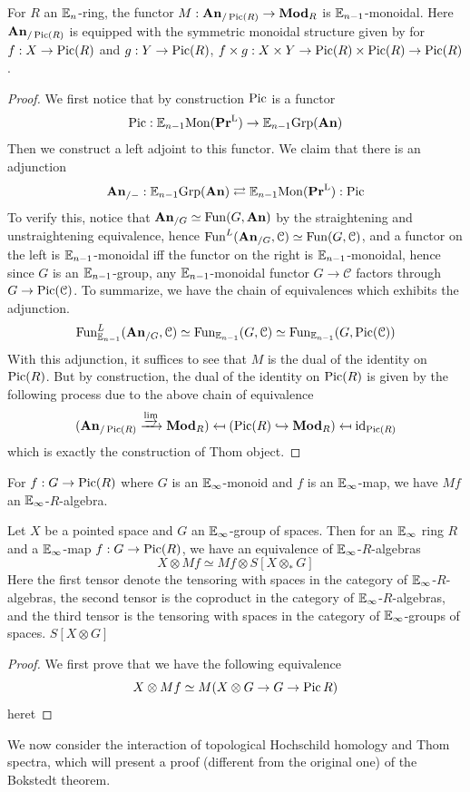 	\begin{thm}\label{Thom_fun_sym_mon}
		For $R$ an $\mathbb{E}_n$-ring, the functor $M:\mathbf{An}_{/\operatorname{\mathrm{Pic}}(R)}\to\mathbf{Mod}_R$ is $\mathbb{E}_{n-1}$-monoidal. Here $\mathbf{An}_{/\operatorname{\mathrm{Pic}}(R)}$ is equipped with the symmetric monoidal structure given by for $f:X\to\operatorname{\mathrm{Pic}}(R)$ and $g:Y\to\operatorname{\mathrm{Pic}}(R)$, $f\times g:X\times Y\to\operatorname{\mathrm{Pic}}(R)\times\operatorname{\mathrm{Pic}}(R)\to\operatorname{\mathrm{Pic}}(R)$. 
	\end{thm}
	\begin{proof}
		We first notice that by construction $\operatorname{\mathrm{Pic}}$ is a functor 
		\[ \operatorname{\mathrm{Pic}}:\mathbb{E}_{n-1}\mathrm{Mon}(\mathbf{Pr}^{\mathrm{L}})\to\mathbb{E}_{n-1}\mathrm{Grp}(\mathbf{An}) \]
		Then we construct a left adjoint to this functor. We claim that there is an adjunction 
		\[ \mathbf{An}_{/-}:\mathbb{E}_{n-1}\mathrm{Grp}(\mathbf{An})\rightleftarrows\mathbb{E}_{n-1}\mathrm{Mon}(\mathbf{Pr}^{\mathrm{L}}):\operatorname{\mathrm{Pic}} \]
		To verify this, notice that $\mathbf{An}_{/G}\simeq\operatorname{\mathrm{Fun}}(G,\mathbf{An})$ by the straightening and unstraightening equivalence, hence $\operatorname{\mathrm{Fun}}^L(\mathbf{An}_{/G},\mathcal{C})\simeq\operatorname{\mathrm{Fun}}(G,\mathcal{C})$, and a functor on the left is $\mathbb{E}_{n-1}$-monoidal iff the functor on the right is $\mathbb{E}_{n-1}$-monoidal, hence since $G$ is an $\mathbb{E}_{n-1}$-group, any $\mathbb{E}_{n-1}$-monoidal functor $G\to\mathcal{C}$ factors through $G\to\operatorname{\mathrm{Pic}}(\mathcal{C})$. To summarize, we have the chain of equivalences which exhibits the adjunction. 
		\[ \operatorname{\mathrm{Fun}}^L_{\mathbb{E}_{n-1}}(\mathbf{An}_{/G},\mathcal{C})\simeq\operatorname{\mathrm{Fun}}_{\mathbb{E}_{n-1}}(G,\mathcal{C})\simeq\operatorname{\mathrm{Fun}}_{\mathbb{E}_{n-1}}(G,\operatorname{\mathrm{Pic}}(\mathcal{C})) \]
		With this adjunction, it suffices to see that $M$ is the dual of the identity on $\operatorname{\mathrm{Pic}}(R)$. But by construction, the dual of the identity on $\operatorname{\mathrm{Pic}}(R)$ is given by the following process due to the above chain of equivalence 
		\[ (\mathbf{An}_{/\operatorname{\mathrm{Pic}}(R)}\xrightarrow{\varinjlim}\mathbf{Mod}_R)\mapsfrom(\operatorname{\mathrm{Pic}}(R)\hookrightarrow\mathbf{Mod}_R)\mapsfrom\operatorname{\mathrm{id}}_{\operatorname{\mathrm{Pic}}(R)} \]
		which is exactly the construction of Thom object. 
	\end{proof}

	\begin{coro}\label{Thom_sp_sym_mon}
		For $f:G\to\operatorname{\mathrm{Pic}}(R)$ where $G$ is an $\mathbb{E}_\infty$-monoid and $f$ is an $\mathbb{E}_\infty$-map, we have $Mf$ an $\mathbb{E}_\infty$-$R$-algebra. 
	\end{coro}
	
	\begin{thm}\label{Space_tensor_E_infty_Thom_obj}
		Let $X$ be a pointed space and $G$ an $\mathbb{E}_\infty$-group of spaces. Then for an $\mathbb{E}_\infty$ ring $R$ and a $\mathbb{E}_\infty$-map $f:G\to\operatorname{\mathrm{Pic}}(R)$, we have an equivalence of $\mathbb{E}_\infty$-$R$-algebras 
		\[ X\otimes Mf\simeq Mf\otimes S[X\otimes_*G] \]
		Here the first tensor denote the tensoring with spaces in the category of $\mathbb{E}_\infty$-$R$-algebras, the second tensor is the coproduct in the category of $\mathbb{E}_\infty$-$R$-algebras, and the third tensor is the tensoring with spaces in the category of $\mathbb{E}_\infty$-groups of spaces. $S[X\otimes G]$
	\end{thm}
	\begin{proof}
		We first prove that we have the following equivalence
		\[ X\otimes Mf\simeq M(X\otimes G\to G\to\operatorname{\mathrm{Pic}} R) \]
		heret
	\end{proof}



	We now consider the interaction of topological Hochschild homology and Thom spectra, which will present a proof (different from the original one) of the Bokstedt theorem. 


